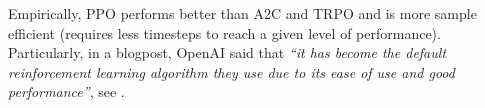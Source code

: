 Empirically, PPO performs better than A2C and TRPO and is more sample efficient (requires less timesteps to reach a given level of performance). Particularly, in a blogpost, OpenAI said that \textit{“it has become the default reinforcement learning algorithm they use due to its ease of use and good performance”}, see \cite{openaiblogpost}.

%


